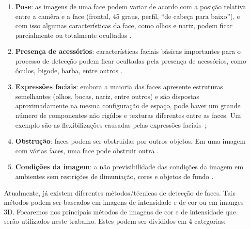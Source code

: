 	\begin{enumerate}
		\item \textbf{Pose}: as imagens de uma face podem variar de acordo com a posição relativa entre a camêra e a face (frontal, 45 graus, perfil, ``de cabeça para baixo''), e com isso algumas características da face, como olhos e nariz, podem ficar parcialmente ou totalmente ocultadas \cite{yang}.
		\item \textbf{Presença de acessórios}: características faciais básicas importantes para o processo de detecção podem ficar ocultadas pela presença de acessórios, como óculos, bigode, barba, entre outros \cite{oliveira, yang}. 
		\item \textbf{Expressões faciais}: embora a maioria das faces apresente estruturas semelhantes (olhos, bocas, nariz, entre outros) e são dispostas aproximadamente na mesma configuração de espaço, pode haver um grande número de componentes não rigídos e texturas diferentes entre as faces. Um exemplo são as flexibilizações causadas pelas expressões faciais~\cite{oliveira, yang};
		\item \textbf{Obstrução}: faces podem ser obstruídas por outros objetos. Em uma imagem com várias faces, uma face pode obstruir outra \cite{yang}.
		\item \textbf{Condições da imagem}: a não previsibilidade das condições da imagem em ambientes sem restrições de ilimuniação, cores e objetos de fundo \cite{oliveira, yang}.
	\end{enumerate}

Atualmente, já existem diferentes métodos/técnicas de detecção de faces. Tais métodos podem ser baseados em imagens de intensidade e de cor ou em imanges 3D. Focaremos nos principais métodos de imagens de cor e de intensidade que serão utilizados neste trabalho. Estes podem ser divididos em 4 categorias:


